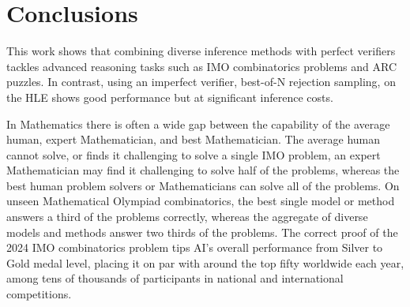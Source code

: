 \section{Conclusions}

This work shows that combining diverse inference methods with perfect verifiers tackles advanced reasoning tasks such as IMO combinatorics problems and ARC puzzles. In contrast, using an imperfect verifier, best-of-N rejection sampling, on the HLE shows good performance but at significant inference costs.

In Mathematics there is often a wide gap between the capability of the average human, expert Mathematician, and best Mathematician. The average human cannot solve, or finds it challenging to solve a single IMO problem, an expert Mathematician may find it challenging to solve half of the problems, whereas the best human problem solvers or Mathematicians can solve all of the problems. On unseen Mathematical Olympiad combinatorics, the best single model or method answers a third of the problems correctly, whereas the aggregate of diverse models and methods answer two thirds of the problems. The correct proof of the 2024 IMO combinatorics problem tips AI's overall performance from Silver to Gold medal level, placing it on par with around the top fifty worldwide each year, among tens of thousands of participants in national and international competitions.

